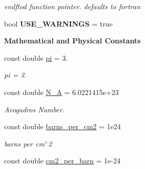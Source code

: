 \begin{DoxyCompactItemize}
\begin{DoxyCompactList}\small\item\em endftod function pointer. defaults to fortran \end{DoxyCompactList}\item 
bool {\bfseries U\+S\+E\+\_\+\+W\+A\+R\+N\+I\+N\+GS} = true\hypertarget{namespacepyne_aaaed56f58559ef169cab906fac4946f8}{}\label{namespacepyne_aaaed56f58559ef169cab906fac4946f8}

\end{DoxyCompactItemize}
\begin{Indent}{\bf Mathematical and Physical Constants}\par
\begin{DoxyCompactItemize}
\item 
const double \hyperlink{namespacepyne_a3b91aba14e56f740dc75b78b9eba037a}{pi} = 3.\hypertarget{namespacepyne_a3b91aba14e56f740dc75b78b9eba037a}{}\label{namespacepyne_a3b91aba14e56f740dc75b78b9eba037a}

\begin{DoxyCompactList}\small\item\em pi = 3. \end{DoxyCompactList}\item 
const double \hyperlink{namespacepyne_a44461c2367af5fc9b6bb0988aac2429b}{N\+\_\+A} = 6.\+0221415e+23\hypertarget{namespacepyne_a44461c2367af5fc9b6bb0988aac2429b}{}\label{namespacepyne_a44461c2367af5fc9b6bb0988aac2429b}

\begin{DoxyCompactList}\small\item\em Avogadro\textquotesingle{}s Number. \end{DoxyCompactList}\item 
const double \hyperlink{namespacepyne_ad475cf6f124859f735f6d93ec206ec0d}{barns\+\_\+per\+\_\+cm2} = 1e24\hypertarget{namespacepyne_ad475cf6f124859f735f6d93ec206ec0d}{}\label{namespacepyne_ad475cf6f124859f735f6d93ec206ec0d}

\begin{DoxyCompactList}\small\item\em barns per cm$^\wedge$2 \end{DoxyCompactList}\item 
const double \hyperlink{namespacepyne_a0706fc6ba35f0c6f85cea550344c1815}{cm2\+\_\+per\+\_\+barn} = 1e-\/24\hypertarget{namespacepyne_a0706fc6ba35f0c6f85cea550344c1815}{}\label{namespacepyne_a0706fc6ba35f0c6f85cea550344c1815}


\end{DoxyCompactItemize}
\end{Indent}

